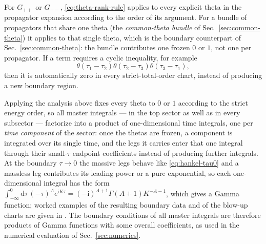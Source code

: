 \documentclass[11pt,a4paper]{article}
\newcommand{\nd}{\mathrm{d}}
\newcommand{\ii}{\mathrm i}
\begin{document}
For $G_{++}$ or $G_{--}$, \eqref{eq:theta-rank-rule} applies to every explicit theta in the
propagator expansion according to the order of its argument. For a bundle of propagators that share
one theta (the \emph{common-theta bundle} of Sec.~\ref{sec:common-theta}) it applies to that single
theta, which is the boundary counterpart of Sec.~\ref{sec:common-theta}: the bundle contributes one
frozen $0$ or $1$, not one per propagator. If a term requires a cyclic
inequality, for example
\begin{equation}
 \theta(\tau_1-\tau_2)\theta(\tau_2-\tau_3)\theta(\tau_3-\tau_1),
 \label{eq:cyclic-theta}
\end{equation}
then it is automatically zero in every strict-total-order chart, instead of producing a new
boundary region.

Applying the analysis above fixes every theta to $0$ or $1$ according to the strict energy order,
so all master integrals --- in the top sector as well as in every subsector --- factorize into a
product of one-dimensional time integrals, one per \emph{time component} of the sector: once the
thetas are frozen, a component is integrated over its single time, and the legs it carries enter that
one integral through their small-$\tau$ endpoint coefficients instead of producing further
integrals. At the boundary $\tau\to0$ the massive legs behave like
\eqref{eq:hankel-tau0} and a massless leg contributes its leading power or a pure exponential, so
each one-dimensional integral has the form
$\int_{-\infty}^0\nd\tau\,(-\tau)^{A}e^{\ii K\tau}=(-\ii)^{A+1}\Gamma(A+1)K^{-A-1}$, which gives a
Gamma function; worked examples of the resulting boundary data and of the blow-up charts are given
in \cite{Chen:2024glu,Chen:2023iix}. The boundary conditions of all master integrals are therefore
products of Gamma functions with some overall coefficients, as used in the numerical evaluation of
Sec.~\ref{sec:numerics}.
\end{document}
